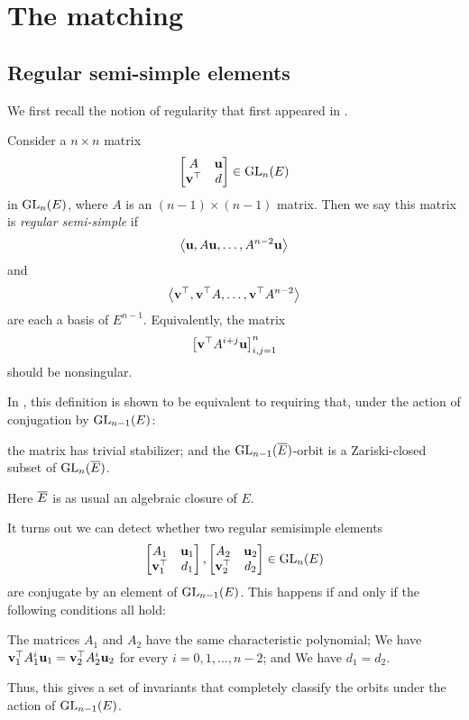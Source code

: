 \section{The matching}
\label{sec:matching}

\subsection{Regular semi-simple elements}
We first recall the notion of regularity
that first appeared in \cite[\S6]{ref:multoneconj}.

\begin{definition}
  Consider a $n \times n$ matrix
  \[ \begin{bmatrix} A & \mathbf u \\ \mathbf v^\top & d \end{bmatrix} \in \operatorname{GL}_n(E) \]
  in $\operatorname{GL}_n(E)$, where $A$ is an $(n-1) \times (n-1)$ matrix.
  Then we say this matrix is \emph{regular semi-simple} if
  \[ \left< \mathbf u, A\mathbf u, \dots, A^{n-2}\mathbf u \right> \]
  and \[ \left< \mathbf v^\top, \mathbf v^\top A, \dots, \mathbf v^\top A^{n-2} \right> \]
  are each a basis of $E^{n-1}$.
  Equivalently, the matrix
  \[ \left[ \mathbf v^\top A^{i+j} \mathbf u \right]_{i,j=1}^n \]
  should be nonsingular.
\end{definition}

\begin{remark}
  In \cite[Theorem 6.1]{ref:multoneconj}, this definition is shown to be equivalent to
  requiring that, under the action of conjugation by $\operatorname{GL}_{n-1}(E)$:
  \begin{itemize}
  \ii the matrix has trivial stabilizer; and
  \ii the $\operatorname{GL}_{n-1}(\overline E)$-orbit is a Zariski-closed subset of $\operatorname{GL}_n(\overline E)$.
  \end{itemize}
  Here $\overline E$ is as usual an algebraic closure of $E$.
\end{remark}

\begin{remark}
  It turns out we can detect whether two regular semisimple elements
  \[
    \begin{bmatrix} A_1 & \mathbf u_1 \\ \mathbf v_1^\top & d_1 \end{bmatrix},
    \begin{bmatrix} A_2 & \mathbf u_2 \\ \mathbf v_2^\top & d_2 \end{bmatrix}
    \in \operatorname{GL}_{n}(E)
  \]
  are conjugate by an element of $\operatorname{GL}_{n-1}(E)$.
  This happens if and only if the following conditions all hold:
  \begin{itemize}
    \ii The matrices $A_1$ and $A_2$ have the same characteristic polynomial;
    \ii We have $\mathbf v_1^\top A_1^i \mathbf u_1 = \mathbf v_2^\top A_2^i \mathbf u_2$
    for every $i = 0, 1, \dots, n-2$; and
    \ii We have $d_1 = d_2$.
  \end{itemize}
  Thus, this gives a set of invariants that completely classify the orbits
  under the action of $\operatorname{GL}_{n-1}(E)$.
  \label{rem:invariants}
\end{remark}

